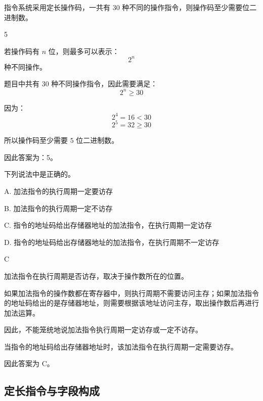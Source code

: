 \begin{question}
指令系统采用定长操作码，一共有 30 种不同的操作指令，则操作码至少需要\underline{\hspace{3cm}}位二进制数。
\end{question}

\begin{answer}
5
\end{answer}

\begin{analysisenv}
若操作码有 $n$ 位，则最多可以表示：
\[
2^n
\]
种不同操作。

题目中共有 30 种不同操作指令，因此需要满足：
\[
2^n \ge 30
\]

因为：
\[
2^4=16<30
\]
\[
2^5=32\ge 30
\]

所以操作码至少需要 $5$ 位二进制数。

因此答案为：5。
\end{analysisenv}



\begin{question}
下列说法中\underline{\hspace{3cm}}是正确的。

A. 加法指令的执行周期一定要访存

B. 加法指令的执行周期一定不访存

C. 指令的地址码给出存储器地址的加法指令，在执行周期一定访存

D. 指令的地址码给出存储器地址的加法指令，在执行周期不一定访存
\end{question}

\begin{answer}
C
\end{answer}

\begin{analysisenv}
加法指令在执行周期是否访存，取决于操作数所在的位置。

如果加法指令的操作数都在寄存器中，则执行周期不需要访问主存；如果加法指令的地址码给出的是存储器地址，则需要根据该地址访问主存，取出操作数后再进行加法运算。

因此，不能笼统地说加法指令执行周期一定访存或一定不访存。

当指令的地址码给出存储器地址时，该加法指令在执行周期一定需要访存。

因此答案为 C。
\end{analysisenv}




\subsection{定长指令与字段构成}

